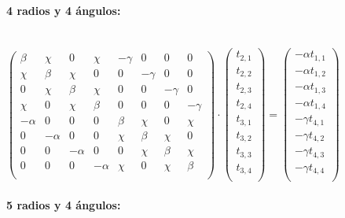 \documentclass[12pt]{article}
\newcommand{\Gpmatrix}[1]{\ensuremath{\begin{pmatrix} #1 \end{pmatrix}}}
\newcommand{\sub}[3]{\ensuremath{#1_{#2,#3}}}
\begin{document}
\paragraph{4 radios y 4 ángulos:} \ \\

\(
\Gpmatrix{
  \beta & \chi & 0 & \chi & -\gamma & 0 & 0 & 0 \\
  \chi & \beta & \chi & 0 & 0 & -\gamma & 0 & 0 \\
  0 & \chi & \beta & \chi & 0 & 0 & -\gamma & 0 \\
  \chi & 0 & \chi & \beta & 0 & 0 & 0 & -\gamma \\
  -\alpha & 0 & 0 & 0 & \beta & \chi & 0 & \chi \\
  0 & -\alpha & 0 & 0 & \chi & \beta & \chi & 0 \\
  0 & 0 & -\alpha & 0 & 0 & \chi & \beta & \chi \\
  0 & 0 & 0 & -\alpha & \chi & 0 & \chi & \beta \\
} \cdot \Gpmatrix{
  \sub{t}{2}{1} \\
  \sub{t}{2}{2} \\
  \sub{t}{2}{3} \\
  \sub{t}{2}{4} \\
  \sub{t}{3}{1} \\
  \sub{t}{3}{2} \\
  \sub{t}{3}{3} \\
  \sub{t}{3}{4} \\
} = \Gpmatrix{
  -\alpha\sub{t}{1}{1} \\
  -\alpha\sub{t}{1}{2} \\
  -\alpha\sub{t}{1}{3} \\
  -\alpha\sub{t}{1}{4} \\
  -\gamma\sub{t}{4}{1} \\
  -\gamma\sub{t}{4}{2} \\
  -\gamma\sub{t}{4}{3} \\
  -\gamma\sub{t}{4}{4} \\
}
\)

\paragraph{5 radios y 4 ángulos:} \ \\
\end{document}
